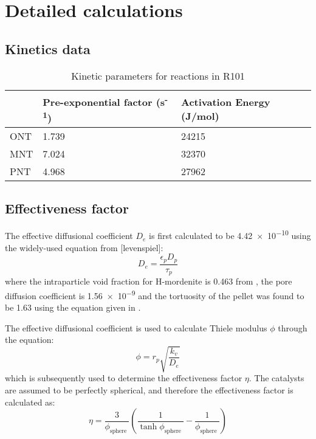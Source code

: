 \section{Detailed calculations}
\label{app:reaction}
\subsection{Kinetics data}

\begin{table}[h]
\centering
\caption{Kinetic parameters for reactions in R101}
\label{tab:R1-kinetic-params}
\begin{tabular}{@{}lll@{}}
\toprule
 & Pre-exponential factor (s\textsuperscript{-1}) & Activation Energy (J/mol) \\ \midrule
ONT & 1.739 & 24215 \\
MNT & 7.024 & 32370 \\
PNT & 4.968 & 27962 \\ \bottomrule
\end{tabular}
\end{table}

\subsection{Effectiveness factor}
\label{app:efffactor}
The effective diffusional coefficient $D_e$ is first calculated to be \num{4.42e-10} using the widely-used equation from [levenspiel]: 
\begin{equation}
    D_e = \frac{\epsilon_p D_p}{\tau_p}
\end{equation}
where the intraparticle void fraction for H-mordenite is 0.463 from \cite{saleman_capacity_2013}, the pore diffusion coefficient is \num{1.56e-9} and the tortuosity of the pellet was found to be 1.63 using the equation given in \textcite{lanfrey_tortuosity_2010}.

The effective diffusional coefficient is used to calculate Thiele modulus $\phi$ through the equation:
\begin{equation}
    \phi = r_p \sqrt{\frac{k_v}{D_e}}
\end{equation}
which is subsequently used to determine the effectiveness factor $\eta$. The catalysts are assumed to be perfectly spherical, and therefore the effectiveness factor is calculated as: 
\begin{equation}
\eta=\frac{3}{\phi_{\text {sphere }}}\left(\frac{1}{\tanh \phi_{\text {sphere }}}-\frac{1}{\phi_{\text {sphere }}}\right)
\end{equation}

